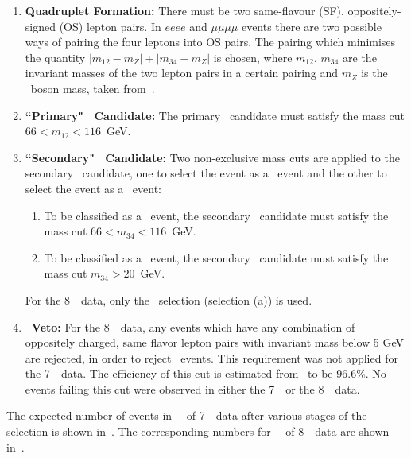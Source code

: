 \begin{enumerate}
    \item {\bf Quadruplet Formation:} There must be two same-flavour (SF),
    oppositely-signed (OS) lepton pairs. In $eeee$ and $\mu\mu\mu\mu$ events there are
    two possible ways of pairing the four leptons into OS pairs. The pairing which
    minimises the quantity $|m_{12}-m_{Z}|+|m_{34}-m_{Z}|$ is chosen, where
    $m_{12}$, $m_{34}$ are the invariant masses of the two lepton pairs in a certain
    pairing and $m_Z$ is the \Z\ boson mass, taken from~\cite{PDG}.

    \item {\bf ``Primary" \Z\ Candidate:} The primary \Z\ candidate must satisfy the mass cut $66<m_{12}<116$~GeV.

    \item {\bf ``Secondary" \Z\ Candidate:} Two non-exclusive mass cuts are
    applied to the secondary \Z\ candidate, one
    to select the event as a \ZZ\ event and the other to select the event as a
    \ZZs\ event:
      \begin{enumerate}
     \item To be classified as a \ZZ\ event, the secondary \Z\ candidate must satisfy
     the mass cut $66<m_{34}<116$~GeV.
     \item To be classified as a \ZZs\ event, the secondary \Z\ candidate
     must satisfy the mass cut $m_{34}>20$~GeV.
    \end{enumerate}
    For the 8~\tev\ data, only the \ZZ\ selection (selection (a)) is used.

    \item {\bf \JPsi\ Veto:} For the 8~\tev\ data, any events which have any
    combination of oppositely charged, same flavor lepton pairs with invariant
    mass below 5 GeV are rejected, in order to reject \JPsi\ events. This
    requirement was not applied for the 7~\tev\ data. The efficiency of this cut
    is estimated from \mc\ to be 96.6\%. No events failing this cut were
    observed in either the 7~\tev\ or the 8~\tev\ data.

\end{enumerate}


The expected number of events in
\LumiPassGRLTwentyEleven\ \ifb\ of 7~\tev\ data after various stages of the
selection is shown in~. The corresponding numbers for
\LumiPassGRLTwentyTwelve\ \ifb\ of 8~\tev\ data are shown
in~.

